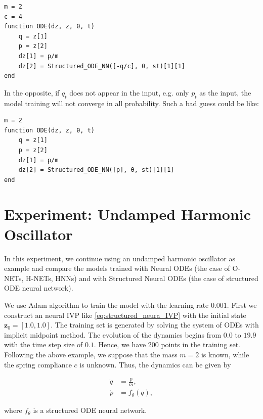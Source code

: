 \documentclass[
	parskip, 			   %
	twoside, 			   %
	DIV=14, 			   %
	BCOR=15.0mm, 		   %
	headsepline, 		   %
	open=right, 		   %
	captions=tableheading, %
	bibliography=totoc,    %
	numbers=noenddot       %
]{scrreprt}
\begin{document}
\begin{verbatim}
m = 2
c = 4
function ODE(dz, z, θ, t)
    q = z[1]
    p = z[2]
    dz[1] = p/m
    dz[2] = Structured_ODE_NN([-q/c], θ, st)[1][1]
end
\end{verbatim}

In the opposite, if $q_t$ does not appear in the input, e.g. only $p_t$ as the input, the model training will not converge in all probability. Such a bad guess could be like:

\begin{verbatim}
m = 2
function ODE(dz, z, θ, t)
    q = z[1]
    p = z[2]
    dz[1] = p/m
    dz[2] = Structured_ODE_NN([p], θ, st)[1][1]
end
\end{verbatim}

\section{Experiment: Undamped Harmonic Oscillator}
In this experiment, we continue using an undamped harmonic oscillator as example and compare the models trained with Neural ODEs (the case of O-NETs, H-NETs, HNNs) and with Structured Neural ODEs (the case of structured ODE neural network).

We use Adam algorithm to train the model with the learning rate $0.001$. First we construct an neural IVP like \ref{eq:structured_neura_IVP} with the initial state $\mathbf{z}_0 = [1.0, 1.0]$. The training set is generated by solving the system of ODEs with implicit midpoint method. The evolution of the dynamics begins from $0.0$ to $19.9$ with the time step size of $0.1$. Hence, we have 200 points in the training set. Following the above example, we suppose that the mass $m=2$ is known, while the spring compliance $c$ is unknown. Thus, the dynamics can be given by

\begin{equation}
    \label{eq:NeuralODE_udho}
    \begin{aligned}
        \dot{q}&=\frac{p}{m},\\
        \dot{p}&=f_{\theta}(q),
    \end{aligned}
\end{equation}

where $f_{\theta}$ is a structured ODE neural network.
\end{document}
